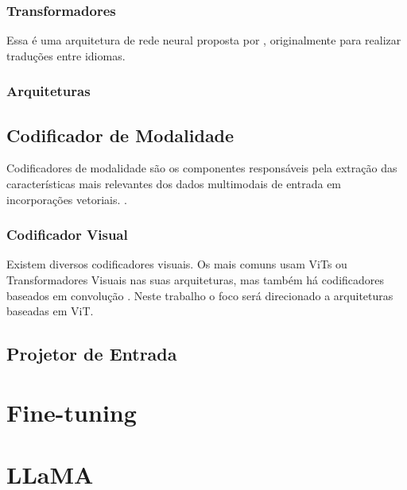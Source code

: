 \subsubsection{Transformadores}

Essa é uma arquitetura de rede neural proposta por \textcite{transformers}, originalmente para realizar traduções entre idiomas.

\subsubsection{Arquiteturas}

\subsection{Codificador de Modalidade}

Codificadores de modalidade são os componentes responsáveis pela extração das características mais relevantes dos dados multimodais de entrada em incorporações vetoriais.
\cite{mllm_survey_2024}.

\subsubsection{Codificador Visual}

Existem diversos codificadores visuais. Os mais comuns usam \acp{ViT} ou Transformadores Visuais nas suas arquiteturas, mas também há codificadores baseados em convolução
\cite{mllm_survey_2023}. Neste trabalho o foco será direcionado a arquiteturas baseadas em \ac{ViT}.


\subsection{Projetor de Entrada}

\section{Fine-tuning}

\section{LLaMA}
